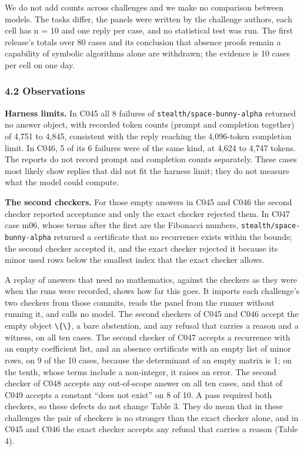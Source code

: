 \documentclass[
  11pt,
]{article}
\newcommand{\passthrough}[1]{#1}
\begin{document}
We do not add counts across challenges and we make no comparison between
models. The tasks differ, the panels were written by the challenge
authors, each cell has n = 10 and one reply per case, and no statistical
test was run. The first release's totals over 80 cases and its
conclusion that absence proofs remain a capability of symbolic
algorithms alone are withdrawn; the evidence is 10 cases per cell on one
day.

\subsubsection{4.2 Observations}\label{observations}

\textbf{Harness limits.} In C045 all 8 failures of
\nolinkurl{stealth/space-bunny-alpha} returned no answer object, with
recorded token counts (prompt and completion together) of 4,751 to
4,845, consistent with the reply reaching the 4,096-token completion
limit. In C046, 5 of its 6 failures were of the same kind, at 4,624 to
4,747 tokens. The reports do not record prompt and completion counts
separately. These cases most likely show replies that did not fit the
harness limit; they do not measure what the model could compute.

\textbf{The second checkers.} For those empty answers in C045 and C046
the second checker reported acceptance and only the exact checker
rejected them. In C047 case m06, whose terms after the first are the
Fibonacci numbers, \nolinkurl{stealth/space-bunny-alpha} returned a
certificate that no recurrence exists within the bounds; the second
checker accepted it, and the exact checker rejected it because its minor
used rows below the smallest index that the exact checker allows.

A replay of answers that need no mathematics, against the checkers as
they were when the runs were recorded, shows how far this goes. It
imports each challenge's two checkers from those commits, reads the
panel from the runner without running it, and calls no model. The second
checkers of C045 and C046 accept the empty object
\passthrough{\lstinline!\{\}!}, a bare abstention, and any refusal that
carries a reason and a witness, on all ten cases. The second checker of
C047 accepts a recurrence with an empty coefficient list, and an absence
certificate with an empty list of minor rows, on 9 of the 10 cases,
because the determinant of an empty matrix is 1; on the tenth, whose
terms include a non-integer, it raises an error. The second checker of
C048 accepts any out-of-scope answer on all ten cases, and that of C049
accepts a constant ``does not exist'' on 8 of 10. A pass required both
checkers, so these defects do not change Table 3. They do mean that in
these challenges the pair of checkers is no stronger than the exact
checker alone, and in C045 and C046 the exact checker accepts any
refusal that carries a reason (Table 4).
\end{document}
